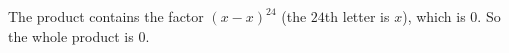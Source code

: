 The product contains the factor $(x-x)^{24}$ (the $24$th letter is $x$), which is $0$. So the whole product is $\boxed{0}$.
